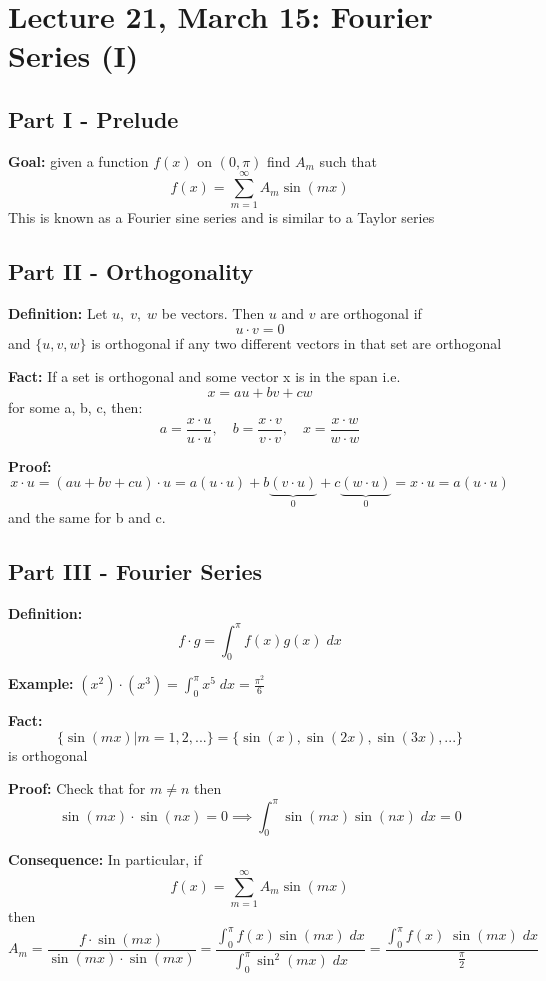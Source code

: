 \documentclass[12pt]{article}
\begin{document}
\section*{Lecture 21, March 15: Fourier Series (I)}
\subsection*{Part I - Prelude}
\textbf{Goal:} given a function $f(x)$ on $(0, \pi)$ find $A_m$ such that 
\[f(x) = \sum_{m=1}^\infty A_m \sin(mx)\]
This is known as a Fourier sine series and is similar to a Taylor series 

\subsection*{Part II - Orthogonality}
\textbf{Definition:} Let $u, \; v, \; w$ be vectors. Then $u$ and $v$ are orthogonal if 
\[u \cdot v = 0\]
and $\{u, v , w\}$ is orthogonal if any two different vectors in that set are orthogonal

\textbf{Fact:} If a set is orthogonal and some vector x is in the span i.e.
\[x = au + bv + cw\]
for some a, b, c, then: 
\[a = \frac{x \cdot u}{u \cdot u}, \quad b = \frac{x \cdot v}{v \cdot v}, \quad x = \frac{x \cdot w}{w \cdot w}\]

\textbf{Proof:} 
\[x \cdot u = (au + bv + cu)\cdot u = a(u\cdot u)+b\underbrace{(v \cdot u)}_0 + c\underbrace{(w \cdot u)}_0= x \cdot u = a(u \cdot u)\]
and the same for b and c. 

\subsection*{Part III - Fourier Series}
\textbf{Definition:} 
\[\boxed{f \cdot g = \int_0^\pi f(x) g(x)\; dx}\]

\textbf{Example:} $(x^2) \cdot (x^3) = \int_0^\pi x^5\; dx = \frac{\pi^2}{6}$

\textbf{Fact:} 
\[\{\sin(mx) | m = 1, 2, ...\} = \{\sin(x), \sin(2x), \sin(3x), ...\}\] 
is orthogonal 

\textbf{Proof:} Check that for $m \neq n$ then 
\[\sin(mx) \cdot \sin(nx) = 0 \implies \int_0^\pi \sin(mx) \sin(nx) \; dx = 0\]

\textbf{Consequence:} In particular, if 
\[f(x) = \sum_{m=1}^\infty A_m \sin(mx)\]
then 
\[A_m = \frac{f \cdot \sin(mx)}{\sin(mx) \cdot \sin(mx)} = \frac{\int_0^\pi f(x) \sin(mx)\; dx}{\int_0^\pi \sin^2(mx) \; dx} = \frac{\int_0^\pi f(x)\; \sin(mx)\; dx}{\frac{\pi}{2}}\]
\end{document}
